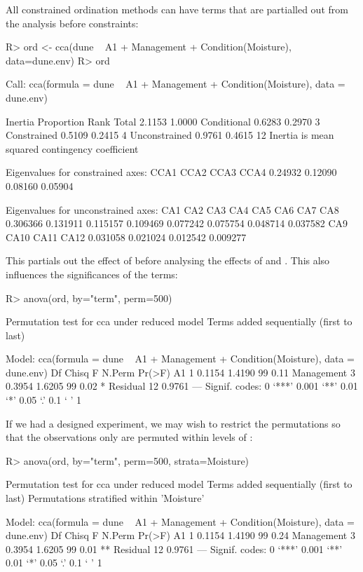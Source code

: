\documentclass[article,nojss]{jss}
\begin{document}
All constrained ordination methods can have terms that are partialled
out from the analysis before constraints:
\begin{Schunk}
\begin{Sinput}
R> ord <- cca(dune ~ A1 + Management + Condition(Moisture), data=dune.env)
R> ord
\end{Sinput}
\begin{Soutput}
Call: cca(formula = dune ~ A1 + Management +
Condition(Moisture), data = dune.env)

              Inertia Proportion Rank
Total          2.1153     1.0000     
Conditional    0.6283     0.2970    3
Constrained    0.5109     0.2415    4
Unconstrained  0.9761     0.4615   12
Inertia is mean squared contingency coefficient 

Eigenvalues for constrained axes:
   CCA1    CCA2    CCA3    CCA4 
0.24932 0.12090 0.08160 0.05904 

Eigenvalues for unconstrained axes:
     CA1      CA2      CA3      CA4      CA5      CA6      CA7      CA8 
0.306366 0.131911 0.115157 0.109469 0.077242 0.075754 0.048714 0.037582 
     CA9     CA10     CA11     CA12 
0.031058 0.021024 0.012542 0.009277 
\end{Soutput}
\end{Schunk}
This partials out the effect of  before analysing the
effects of  and .  This also influences
the significances of the terms:
\begin{Schunk}
\begin{Sinput}
R> anova(ord, by="term", perm=500)
\end{Sinput}
\begin{Soutput}
Permutation test for cca under reduced model
Terms added sequentially (first to last)

Model: cca(formula = dune ~ A1 + Management + Condition(Moisture), data = dune.env)
           Df  Chisq      F N.Perm Pr(>F)  
A1          1 0.1154 1.4190     99   0.11  
Management  3 0.3954 1.6205     99   0.02 *
Residual   12 0.9761                       
---
Signif. codes:  0 ‘***’ 0.001 ‘**’ 0.01 ‘*’ 0.05 ‘.’ 0.1 ‘ ’ 1
\end{Soutput}
\end{Schunk}
If we had a designed experiment, we may wish to restrict the
permutations so that the observations only are permuted within levels
of :
\begin{Schunk}
\begin{Sinput}
R> anova(ord, by="term", perm=500, strata=Moisture)
\end{Sinput}
\begin{Soutput}
Permutation test for cca under reduced model
Terms added sequentially (first to last)
Permutations stratified within 'Moisture'

Model: cca(formula = dune ~ A1 + Management + Condition(Moisture), data = dune.env)
           Df  Chisq      F N.Perm Pr(>F)   
A1          1 0.1154 1.4190     99   0.24   
Management  3 0.3954 1.6205     99   0.01 **
Residual   12 0.9761                        
---
Signif. codes:  0 ‘***’ 0.001 ‘**’ 0.01 ‘*’ 0.05 ‘.’ 0.1 ‘ ’ 1
\end{Soutput}
\end{Schunk}

\end{document}
